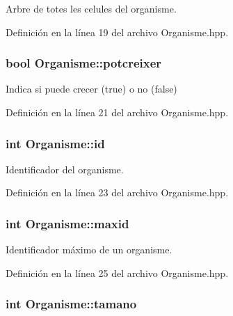 Arbre de totes les celules del organisme. 



Definición en la línea 19 del archivo Organisme.\-hpp.

\hypertarget{class_organisme_a7b2b434f51af578ace7b37993aedd4f9}{
\subsubsection[{potcreixer}]{\setlength{\rightskip}{0pt plus 5cm}bool Organisme\-::potcreixer\hspace{0.3cm}{\ttfamily [private]}}}\label{class_organisme_a7b2b434f51af578ace7b37993aedd4f9}


Indica si puede crecer (true) o no (false) 



Definición en la línea 21 del archivo Organisme.\-hpp.

\hypertarget{class_organisme_ac2f0882eb2985d187f189fd238ceece3}{
\subsubsection[{id}]{\setlength{\rightskip}{0pt plus 5cm}int Organisme\-::id\hspace{0.3cm}{\ttfamily [private]}}}\label{class_organisme_ac2f0882eb2985d187f189fd238ceece3}


Identificador del organisme. 



Definición en la línea 23 del archivo Organisme.\-hpp.

\hypertarget{class_organisme_a51070ec93d218a7c77af9817ca27fe8f}{
\subsubsection[{maxid}]{\setlength{\rightskip}{0pt plus 5cm}int Organisme\-::maxid\hspace{0.3cm}{\ttfamily [private]}}}\label{class_organisme_a51070ec93d218a7c77af9817ca27fe8f}


Identificador máximo de un organisme. 



Definición en la línea 25 del archivo Organisme.\-hpp.

\hypertarget{class_organisme_a03277939e7c5be36d0ee183ae6fa99c4}{
\subsubsection[{tamano}]{\setlength{\rightskip}{0pt plus 5cm}int Organisme\-::tamano\hspace{0.3cm}{\ttfamily [private]}}}\label{class_organisme_a03277939e7c5be36d0ee183ae6fa99c4}


